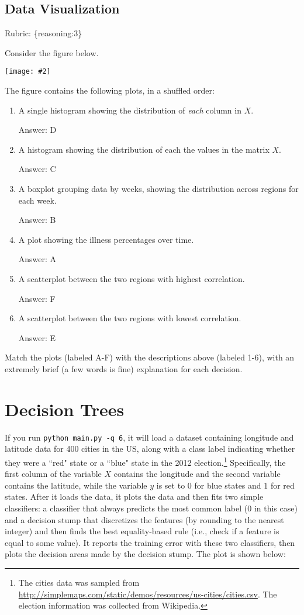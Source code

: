 \documentclass{article}
\def\rubric#1{\gre{Rubric: \{#1\}}}{}
\def\ans#1{\par\gre{Answer: #1}}
\def\blu#1{{\color{blu}#1}}
\def\gre#1{{\color{gre}#1}}
\newcommand{\fig}[2]{\texttt{[image: \#2]}}
\def\enum#1{\begin{enumerate}#1\end{enumerate}}
\begin{document}
\subsection{Data Visualization}
\rubric{reasoning:3}

Consider the figure below.

\fig{1}{../figs/visualize-unlabeled}

The figure contains the following plots, in a shuffled order:
\enum{
\item A single histogram showing the distribution of \emph{each} column in $X$.
\ans{D}
\item A histogram showing the distribution of each the values in the matrix $X$.
\ans{C}
\item A boxplot grouping data by weeks, showing the distribution across regions for each week.
\ans{B}
\item A plot showing the illness percentages over time.
\ans{A}
\item A scatterplot between the two regions with highest correlation.
\ans{F}
\item A scatterplot between the two regions with lowest correlation.
\ans{E}
}

\blu{Match the plots (labeled A-F) with the descriptions above (labeled 1-6), with an extremely brief (a few words is fine) explanation for each decision.}



\section{Decision Trees}

If you run \texttt{python main.py -q 6}, it will load a dataset containing longitude 
and latitude data for 400 cities in the US, along with a class label indicating
 whether they were a ``red" state or a ``blue" state in the 2012 
 election.\footnote{The cities data was sampled from \url{http://simplemaps.com/static/demos/resources/us-cities/cities.csv}. The election information was collected from Wikipedia.}
Specifically, the first column of the variable $X$ contains the 
longitude and the second variable contains the latitude,
while the variable $y$ is set to $0$ for blue states and $1$ for red states.
After it loads the data, it plots the data and then fits two simple 
classifiers: a classifier that always predicts the
most common label ($0$ in this case) and a decision stump
that discretizes the features (by rounding to the nearest integer)
and then finds the best equality-based rule (i.e., check
 if a feature is equal to some value).
It reports the training error with these two classifiers, then plots the decision areas made by the decision stump.
The plot is shown below:
\end{document}
